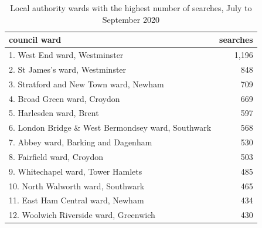 \documentclass[
  a4paper,
  twoside, 11pt]{article}
\begin{document}
\begin{table}

\caption{\label{tab:table-ward}Local authority wards with the highest number of searches, July to September 2020}
\centering
\begin{tabular}[t]{lr}
\toprule
council ward & searches\\
\midrule
1. West End ward, Westminster & 1,196\\
2. St James's ward, Westminster & 848\\
3. Stratford and New Town ward, Newham & 709\\
4. Broad Green ward, Croydon & 669\\
5. Harlesden ward, Brent & 597\\
6. London Bridge \& West Bermondsey ward, Southwark & 568\\
7. Abbey ward, Barking and Dagenham & 530\\
8. Fairfield ward, Croydon & 503\\
9. Whitechapel ward, Tower Hamlets & 485\\
10. North Walworth ward, Southwark & 465\\
11. East Ham Central ward, Newham & 434\\
12. Woolwich Riverside ward, Greenwich & 430\\
\bottomrule
\end{tabular}
\end{table}

\restoregeometry
\end{document}
